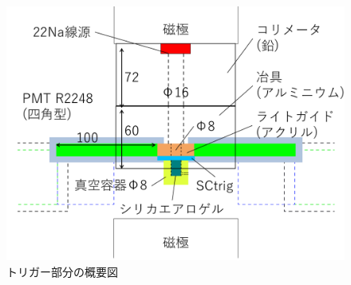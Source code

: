 \begin{figure}[H]
\centering
\includegraphics[keepaspectratio,scale=0.4]{fig/ybm/device4.pdf}
\caption{トリガー部分の概要図}
\label{fig:device3}
\end{figure}

